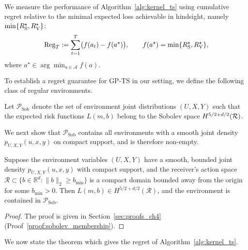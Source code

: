 We measure the performance of Algorithm~\ref{alg:kernel_ts} using cumulative regret relative to the minimal expected loss achievable in hindsight, namely $\min\{R_{\mathrm{S}}^\star, R_{\mathrm{V}}^\star\}$:
\begin{equation}
\label{eq:online_regret_definition}\index{Cumulative regret|textbf}
    \operatorname{Reg}_T := \sum_{t=1}^T \bigl(f(a_t) - f(a^\star)\bigr), \qquad f(a^\star) = \min\{\RS^\star, \RV^\star\},
\end{equation}
where $a^\star \in \arg\min_{a \in \mathcal{A}} f(a)$.

To establish a regret guarantee for GP-TS in our setting, we define the following class of regular environments.

\begin{definition}\label{def:sobolev_risk}
Let $\mathcal{P}_{\text{Sob}}$ denote the set of environment joint distributions $(U,X,Y)$ such that the expected risk functions $L(m,b)$ belong to the Sobolev space $H^{5/2 + d/2}(\mathcal{R})$.
\end{definition}

We next show that $\mathcal{P}_{\text{Sob}}$ contains all environments with a smooth joint density $p_{U,X,Y}(u,x,y)$ on compact support, and is therefore non-empty.

\begin{lemma}
\label{lem:sobolev_membership}
Suppose the environment variables $(U, X, Y)$ have a smooth, bounded joint density $p_{U,X,Y}(u,x,y)$ with compact support, and the receiver's action space $\mathcal{R} \subset \{b \in \mathbb{R}^d : \|b\|_2 \ge b_{\min}\}$ is a compact domain bounded away from the origin for some $b_{\min} > 0$. Then $L(m, b) \in H^{5/2 + d/2}(\mathcal{R})$, and the environment is contained in $\mathcal{P}_{\text{Sob}}$.
\end{lemma}
\begin{proof} The proof is given in Section~\ref{sec:proofs_ch4} (Proof~\ref{proof:sobolev_membership}).
\end{proof}

We now state the theorem which gives the regret of Algorithm~\ref{alg:kernel_ts}.

